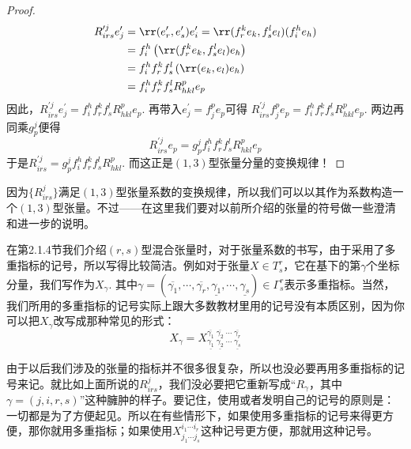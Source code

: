 \begin{proof}
\[\begin{split}
	 R^{\prime j}_{irs}e^{\prime}_{j}&=\rr(e^{\prime}_{r},e^{\prime}_{s})e^{\prime}_{i}=\rr(f^{k}_{r}e_{k},f^{l}_{s}e_{l})(f^{h}_{i}e_{h})\\
	 &=f^{h}_{i}\left(\rr(f^{k}_{r}e_{k},f^{l}_{s}e_{l}) e_{h} \right)\\
	 &=f^{h}_{i}f^{k}_{r}f^{l}_{s}\left(\rr(e_{k},e_{l}) e_{h} \right)\\
	 &=f^{h}_{i}f^{k}_{r}f^{l}_{s}R_{hkl}^{p}e_{p}
	\end{split}
	\]
	因此，$R^{\prime j}_{irs}e^{\prime}_{j}=f^{h}_{i}f^{k}_{r}f^{l}_{s}R_{hkl}^{p}e_{p}$. 再带入$e^{\prime}_{j}=f^{p}_{j}e_{p}$可得
	$R^{\prime j}_{irs}f^{p}_{j}e_{p}=f^{h}_{i}f^{k}_{r}f^{l}_{s}R_{hkl}^{p}e_{p}$. 两边再同乘$g_{p}^{j}$便得
	\[
	R^{\prime j}_{irs} e_{p}=g_{p}^{j}f^{h}_{i}f^{k}_{r}f^{l}_{s}R_{hkl}^{p}e_{p}
	\]
	于是$R^{\prime j}_{irs} =g_{p}^{j}f^{h}_{i}f^{k}_{r}f^{l}_{s}R_{hkl}^{p}$. 而这正是$(1,3)$型张量分量的变换规律！
\end{proof}

因为$\{R^{j}_{irs} \}$满足$(1,3)$型张量系数的变换规律，所以我们可以以其作为系数构造一个$(1,3)$型张量。不过——在这里我们要对以前所介绍的张量的符号做一些澄清和进一步的说明。

在第2.1.4节我们介绍$(r,s)$型混合张量时，对于张量系数的书写，由于采用了多重指标的记号，所以写得比较简洁。例如对于张量$X\in T^{r}_{s}$，它在基下的第$\gamma$个坐标分量，我们写作为$X_{\gamma}$. 其中$\gamma=(\overline{\gamma_{1}},\cdots,\overline{\gamma_{r }},\underline{\gamma_{1}},\cdots,\underline{\gamma_{s }})\in \Gamma^{r }_{s }$表示多重指标。当然，我们所用的多重指标的记号实际上跟大多数教材里用的记号没有本质区别，因为你可以把$X_{\gamma}$改写成那种常见的形式：
\[
X_{\gamma}=X^{\overline{\gamma_{1}} \;\overline{\gamma_{2}}\;\cdots\; \overline{\gamma_{r }}}_{\underline{\gamma_{1}}\;\underline{\gamma_{2}} \;\cdots \;\underline{\gamma_{s }}}
\]

由于以后我们涉及的张量的指标并不很多很复杂，所以也没必要再用多重指标的记号来记。就比如上面所说的$R^{j}_{irs}$，我们没必要把它重新写成“$R_{\gamma}$，其中$\gamma=(j,i,r,s)$”这种臃肿的样子。要记住，使用或者发明自己的记号的原则是：一切都是为了方便起见。所以在有些情形下，如果使用多重指标的记号来得更方便，那你就用多重指标；如果使用$X^{i_{1}\cdots i_{r}}_{j_{1}\cdots j_{s}}$这种记号更方便，那就用这种记号。

